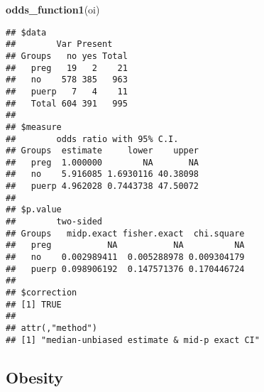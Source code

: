 \documentclass[
]{article}
\newenvironment{Shaded}{\begin{snugshade}}{\end{snugshade}}
\newcommand{\DataTypeTok}[1]{\textcolor[rgb]{0.13,0.29,0.53}{#1}}
\newcommand{\KeywordTok}[1]{\textcolor[rgb]{0.13,0.29,0.53}{\textbf{#1}}}
\newcommand{\NormalTok}[1]{#1}
\newcommand{\OperatorTok}[1]{\textcolor[rgb]{0.81,0.36,0.00}{\textbf{#1}}}
\newcommand{\OtherTok}[1]{\textcolor[rgb]{0.56,0.35,0.01}{#1}}
\newcommand{\StringTok}[1]{\textcolor[rgb]{0.31,0.60,0.02}{#1}}
\begin{document}
\begin{Shaded}
\begin{Highlighting}[]
\KeywordTok{odds_function1}\NormalTok{(oi)}
\end{Highlighting}
\end{Shaded}

\begin{verbatim}
## $data
##        Var Present
## Groups   no yes Total
##   preg   19   2    21
##   no    578 385   963
##   puerp   7   4    11
##   Total 604 391   995
## 
## $measure
##        odds ratio with 95% C.I.
## Groups  estimate     lower    upper
##   preg  1.000000        NA       NA
##   no    5.916085 1.6930116 40.38098
##   puerp 4.962028 0.7443738 47.50072
## 
## $p.value
##        two-sided
## Groups   midp.exact fisher.exact  chi.square
##   preg           NA           NA          NA
##   no    0.002989411  0.005288978 0.009304179
##   puerp 0.098906192  0.147571376 0.170446724
## 
## $correction
## [1] TRUE
## 
## attr(,"method")
## [1] "median-unbiased estimate & mid-p exact CI"
\end{verbatim}

\hypertarget{obesity}{%
\subsection{Obesity}\label{obesity}}

\begin{Shaded}
\end{Shaded}

\begin{Shaded}
\end{Shaded}
\end{document}
